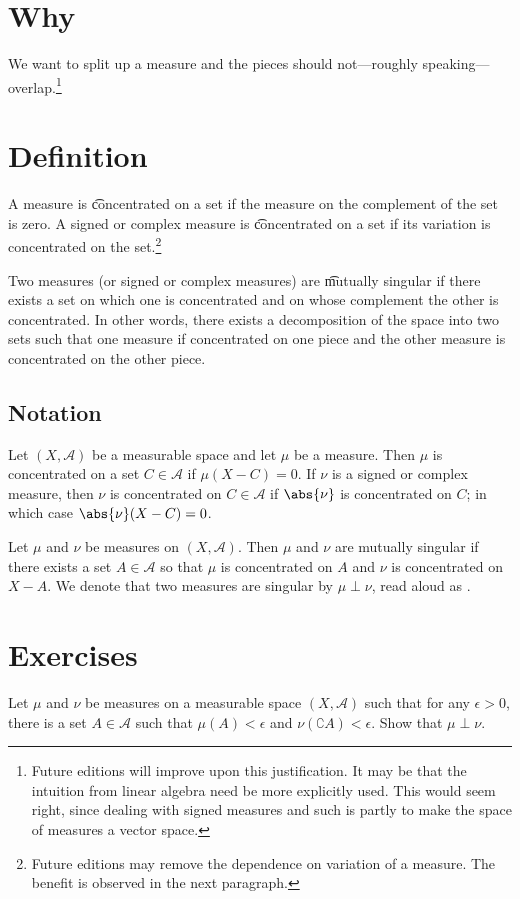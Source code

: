 

\section*{Why}

We want to split up a measure and the pieces should not---roughly speaking---overlap.\footnote{Future editions will improve upon this justification. It may be that the intuition from linear algebra need be more explicitly used. This would seem right, since dealing with signed measures and such is partly to make the space of measures a vector space.}

\section*{Definition}

A measure is \t{concentrated} on a set if the measure on the complement of the set is zero.
A signed or complex measure is \t{concentrated} on a set if its variation is concentrated on the set.\footnote{Future editions may remove the dependence on variation of a measure. The benefit is observed in the next paragraph.}

Two measures (or signed or complex measures) are \t{mutually singular} if there exists a set on which one is concentrated and on whose complement the other is concentrated.
In other words, there exists a decomposition of the space into two sets such that one measure if concentrated on one piece and the other measure is concentrated on the other piece.

\subsection*{Notation}

Let $(X, \mathcal{A} )$ be a measurable space and let $\mu $ be a measure.
Then $\mu $ is concentrated on a set $C \in \mathcal{A} $ if $\mu (X - C) = 0$.
If $\nu $ is a signed or complex measure, then $\nu $ is concentrated on $C \in \mathcal{A} $ if $\abs{\nu }$ is concentrated on $C$; in which case $\abs{\nu }(X - C) = 0$.

Let $\mu $ and $\nu $ be measures on $(X, \mathcal{A} )$.
Then $\mu $ and $\nu $ are mutually singular if there exists a set $A \in \mathcal{A} $ so that $\mu $ is concentrated on $A$ and $\nu $ is concentrated on $X - A$.
We denote that two measures are singular by $\mu  \perp  \nu $, read aloud as .

\section*{Exercises}

\begin{exercise}
Let $\mu $ and $\nu $ be measures on a measurable space $(X, \mathcal{A} )$ such that for any $\epsilon  > 0$, there is a set $A \in \mathcal{A} $ such that $\mu (A) < \epsilon $ and $\nu (\complement{A}) < \epsilon $. Show that $\mu  \perp  \nu $.\end{exercise}